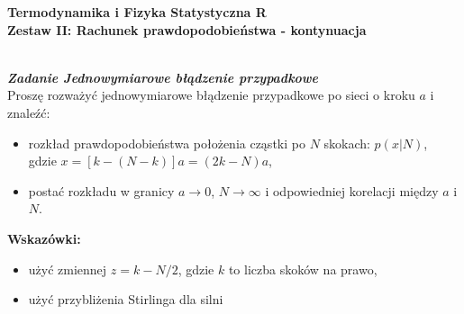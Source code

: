 \documentclass[11pt,a4paper]{article}
\newcounter{zadanie}\newcommand{\zadanie}[1][]{\addtocounter{zadanie}{1} ~\\  {\bf \emph{Zadanie \arabic{zadanie} #1 }} \\}
\begin{document}
         

\begin{centering}
  {\bf {\Large
  Termodynamika i Fizyka Statystyczna R \\
  Zestaw II: Rachunek prawdopodobieństwa - kontynuacja
  }} \\  
\end{centering}

\vspace{1cm}
\zadanie[Jednowymiarowe błądzenie przypadkowe]

Proszę rozważyć jednowymiarowe błądzenie przypadkowe po sieci o kroku $a$ 
i znaleźć:
\begin{itemize}
    \item rozkład prawdopodobieństwa położenia cząstki po $N$ skokach:
          $p(x|N)$, \\
          gdzie $x = [k - (N - k)]a = (2k - N)a$,
    \item postać rozkładu w granicy $a \to 0$, $N \to \infty$ i 
          odpowiedniej korelacji między $a$ i $N$.
\end{itemize}

{\bf Wskazówki:} 
\begin{itemize}
\item użyć zmiennej $z = k - N/2$, gdzie $k$ to liczba skoków na prawo, 
\item użyć przybliżenia Stirlinga dla silni
\end{itemize}
\end{document}
